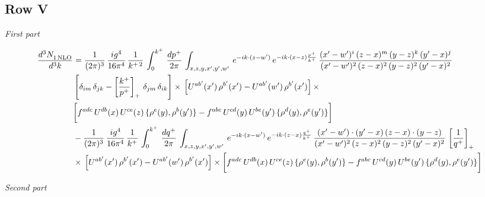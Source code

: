 \documentclass[9pt]{article}
\numberwithin{equation}{section}
\begin{document}
\subsection{Row V}
{\color{orange}\sloppy{}\par
\par\noindent\textit{First part}\par
\begin{align*}
     \frac{d^{3}N_{1\,\rm NLO}^{\rm}}{d^{3}k}  & =  \frac{1}{(2\pi)^{3}}\, \frac{ig^{4}}{16\pi^{4}}\, \frac{1}{k^{+\,2}}\,\int_{0}^{k^{+}}\, \frac{dp^{+}}{2\pi}\,\int_{x,z,y,x',y'{,}w'}\,e^{-ik\cdot (z-w^\prime)}\,e^{-ik\cdot (x-z)\frac{p^{+}}{k^{+}}}\,\frac{(x'-w')^{i}\,(z-x)^{m}\,(y-z)^{k}\,(y'-x)^{j}}{(x'-w')^{2}\,(z-x)^{2}\,(y-z)^{2}\,(y'-x)^{2}}\,\notag \\ & \left[\delta_{im}\,\delta_{jk}-\left[\frac{k^{+}}{p^{+}}\right]_{+}\, \delta_{jm}\,\delta_{ik}\right]\times\, \left[U^{ab'}(x')\,\rho^{b'}(x')-U^{ab'}(w')\,\rho^{b'}(x')\right]\times\notag \\ & \bigg[f^{adc}\,U^{db}(x)\,U^{ce}(z)\, \{\rho^{e}(y),\rho^{b}(y')\}-f^{abc}\,U^{cd}(y)\,U^{be}(y')\, \{\rho^{d}(y),\rho^{e}(y')\}\bigg] \notag \\ & -\frac{1}{(2\pi)^{3}}\, \frac{ig^{4}}{16\pi^{4}}\, \frac{1}{k^{+}}\,\int_{0}^{k^{+}}\, \frac{dq^{+}}{2\pi}\,\int_{x,z,y,x',y'{,}w'}\,e^{-ik\cdot (x-w^\prime)}\,e^{-ik\cdot (z-x)\frac{q^{+}}{k^{+}}}\,\frac{(x'-w')\cdot (y'-x)\,(z-x)\cdot (y-z)}{(x'-w')^{2}\,(z-x)^{2}\,(y-z)^{2}\,(y'-x)^{2}}\,\left[\frac{1}{q^{+}}\right]_{+}\notag \\ & \times\, \left[U^{ab'}(x')\,\rho^{b'}(x')-U^{ab'}(w')\,\rho^{b'}(x')\right]\times \bigg[f^{adc}\,U^{db}(x)\,U^{ce}(z)\, \{\rho^{e}(y),\rho^{b}(y')\}-f^{abc}\,U^{cd}(y)\,U^{be}(y')\, \{\rho^{d}(y),\rho^{e}(y')\}\bigg]
\end{align*}
\par\noindent\textit{Second part}\par
\begin{align*}

\end{align*}}
\end{document}
